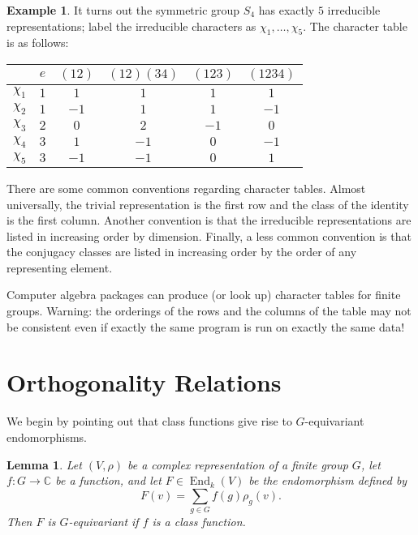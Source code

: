 \documentclass[12pt]{article}
\theoremstyle{plain}
\newtheorem{lemma}[theorem]{Lemma}
\theoremstyle{definition}
\newtheorem{example}[theorem]{Example}
\theoremstyle{remark}
\numberwithin{equation}{section}
\begin{document}
\begin{example}
It turns out the symmetric group $S_4$ has exactly $5$ irreducible
representations; label the irreducible characters
as $\chi_1, \ldots, \chi_5$.
The character table is as follows:
\begin{center}
\begin{tabular}{|c|c|c|c|c|c|}
\hline 
 & $e $ & $(12)$ & $(12)(34)$ & $(123)$ & $(1234)$\\
\hline 
\hline 
$\chi_1$ & $1$ & $1$ & $1$ & $1$ & $1$\\
\hline 
$\chi_2$ & $1$ & $-1$ & $1$ & $1$ & $-1$\\
\hline 
$\chi_3$ & $2$ & $0$ & $2$ & $-1$ & $0$\\
\hline 
$\chi_4$ & $3$ & $1$ & $-1$ & $0$ & $-1$\\
\hline 
$\chi_5$ & $3$ & $-1$ & $-1$ & $0$ & $1$\\
\hline 
\end{tabular}
\end{center}
\end{example}

There are some common conventions regarding character tables.
Almost universally,
the trivial representation is the first row and the class of the
identity is the first column.
Another convention is that the irreducible representations are listed in
increasing order by dimension.
Finally, a less common convention is that the conjugacy classes are listed in
increasing order by the order of any representing element.

Computer algebra packages can produce (or look up) character tables
for finite groups.  Warning: the orderings of the rows and the columns of the
table may not be consistent even if exactly the same program is run on
exactly the same data!

\section{Orthogonality Relations}

We begin by pointing out that class functions give rise to
$G$-equivariant endomorphisms.

\begin{lemma} \label{lem:class_function_endo}
Let $(V,\rho)$ be a complex representation of a finite group $G$,
let $f : G \to \mathbb{C}$ be a function, and let $F \in
\operatorname{End}_k(V)$ be the endomorphism defined by
\[
F(v) = \sum_{g \in G} f(g)\rho_g(v) .
\]
Then $F$ is $G$-equivariant if $f$ is a class function.
\end{lemma}
\end{document}

